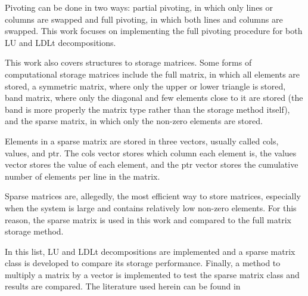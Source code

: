 Pivoting can be done in two ways: partial pivoting, in which only lines or columns are swapped and full pivoting, in which both lines and columns are swapped. This work focuses on implementing the full pivoting procedure for both LU and LDLt decompositions.

This work also covers structures to storage matrices. Some forms of computational storage matrices include the full matrix, in which all elements are stored, a symmetric matrix, where only the upper or lower triangle is stored, band matrix, where only the diagonal and few elements close to it are stored (the band is more properly the matrix type rather than the storage method itself), and the sparse matrix, in which only the non-zero elements are stored. 

Elements in a sparse matrix are stored in three vectors, usually called cols, values, and ptr. The cols vector stores which column each element is, the values vector stores the value of each element, and the ptr vector stores the cumulative number of elements per line in the matrix.

Sparse matrices are, allegedly, the most efficient way to store matrices, especially when the system is large and contains relatively low non-zero elements. For this reason, the sparse matrix is used in this work and compared to the full matrix storage method.

In this list, LU and LDLt decompositions are implemented and a sparse matrix class is developed to compare its storage performance. Finally, a method to multiply a matrix by a vector is implemented to test the sparse matrix class and results are compared. The literature used herein can be found in \cite{de2000metodos,golub2013matrix,strang2022introduction,jennings1977matrix}